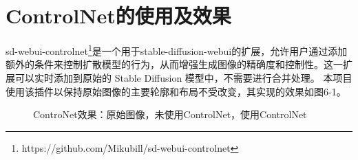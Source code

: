 \documentclass[a4paper,AutoFakeBold,oneside,12pt]{book}
\begin{document}
\section{ControlNet的使用及效果}
sd-webui-controlnet\footnote{https://github.com/Mikubill/sd-webui-controlnet}是一个用于stable-diffusion-webui的扩展，允许用户通过添加额外的条件来控制扩散模型的行为，从而增强生成图像的精确度和控制性。这一扩展可以实时添加到原始的 Stable Diffusion 模型中，不需要进行合并处理。
本项目使用该插件以保持原始图像的主要轮廓和布局不受改变，其实现的效果如图6-1。
\begin{figure}[!htbp]
    \centering
    \quad %
    \quad %
    \caption{ControNet效果：\protect{}原始图像，\protect{}未使用ControlNet，\protect{}使用ControlNet} %
    \label{Fig:ControlNet} %
\end{figure}
\end{document}
